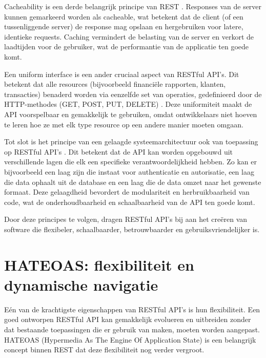 \bigskip

Cacheability is een derde belangrijk principe van REST  \autocite{Fielding2000}. Responses van de server kunnen gemarkeerd worden als cacheable, wat betekent dat de client (of een tussenliggende server) de response mag opslaan en hergebruiken voor latere, identieke requests. Caching vermindert de belasting van de server en verkort de laadtijden voor de gebruiker, wat de performantie van de applicatie ten goede komt.

\bigskip

Een uniform interface is een ander cruciaal aspect van RESTful API's. Dit betekent dat alle resources (bijvoorbeeld financiële rapporten, klanten, transacties) benaderd worden via eenzelfde set van operaties, gedefinieerd door de HTTP-methodes (GET, POST, PUT, DELETE) \autocite{Fielding2000}. Deze uniformiteit maakt de API voorspelbaar en gemakkelijk te gebruiken, omdat ontwikkelaars niet hoeven te leren hoe ze met elk type resource op een andere manier moeten omgaan.

\bigskip

Tot slot is het principe van een gelaagde systeemarchitectuur ook van toepassing op RESTful API's \autocite{Fielding2000}. Dit betekent dat de API kan worden opgebouwd uit verschillende lagen die elk een specifieke verantwoordelijkheid hebben. Zo kan er bijvoorbeeld een laag zijn die instaat voor authenticatie en autorisatie, een laag die data ophaalt uit de database en een laag die de data omzet naar het gewenste formaat. Deze gelaagdheid bevordert de modulariteit en herbruikbaarheid van code, wat de onderhoudbaarheid en schaalbaarheid van de API ten goede komt.

\bigskip

Door deze principes te volgen, dragen RESTful API's bij aan het creëren van software die flexibeler, schaalbaarder, betrouwbaarder en gebruiksvriendelijker is. 

\section{HATEOAS: flexibiliteit en dynamische navigatie}

Eén van de krachtigste eigenschappen van RESTful API's is hun flexibiliteit. Een goed ontworpen RESTful API kan gemakkelijk evolueren en uitbreiden zonder dat bestaande toepassingen die er gebruik van maken, moeten worden aangepast. HATEOAS (Hypermedia As The Engine Of Application State) is een belangrijk concept binnen REST dat deze flexibiliteit nog verder vergroot.

